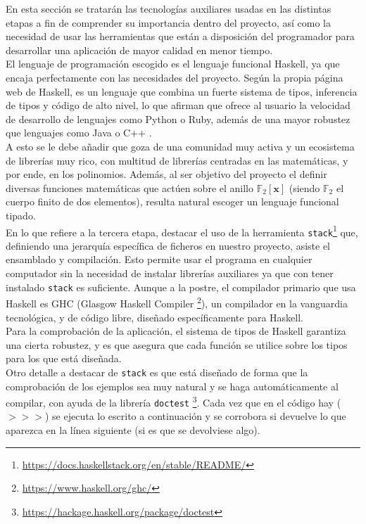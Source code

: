 En esta sección se tratarán las tecnologías auxiliares usadas en las distintas etapas a fin de comprender su importancia dentro del proyecto, así como la necesidad de usar las herramientas que están a disposición del programador para desarrollar una aplicación de mayor calidad en menor tiempo.\\

El lenguaje de programación escogido es el lenguaje funcional Haskell, ya que encaja perfectamente con las necesidades del proyecto. Según la propia página web de Haskell, es un lenguaje que combina un fuerte sistema de tipos, inferencia de tipos y código de alto nivel, lo que afirman que ofrece al usuario la velocidad de desarrollo de lenguajes como Python o Ruby, además de una mayor robustez que lenguajes como Java o C++ .\\

A esto se le debe añadir que goza de una comunidad muy activa y un ecosistema de librerías muy rico, con multitud de librerías centradas en las matemáticas, y por ende, en los polinomios. Además, al ser objetivo del proyecto el definir diversas funciones matemáticas que actúen sobre el anillo $\mathbb{F}_2 [\textbf{x}]$ (siendo $\mathbb{F}_2$ el cuerpo finito de dos elementos), resulta natural escoger un lenguaje funcional tipado.\\

En lo que refiere a la tercera etapa, destacar el uso de la herramienta \texttt{stack}\footnote{\url{https://docs.haskellstack.org/en/stable/README/}} que, definiendo una jerarquía específica de ficheros en nuestro proyecto, asiste el ensamblado y compilación. Esto permite usar el programa en cualquier computador sin la necesidad de instalar librerías auxiliares ya que con tener instalado \texttt{stack} es suficiente. Aunque a la postre, el compilador primario que usa Haskell es GHC (Glasgow Haskell Compiler \footnote{\url{https://www.haskell.org/ghc/}}), un compilador en la vanguardia tecnológica, y de código libre, diseñado específicamente para Haskell.\\

Para la comprobación de la aplicación, el sistema de tipos de Haskell garantiza una cierta robustez, y es que asegura que cada función se utilice sobre los tipos para los que está diseñada.\\

Otro detalle a destacar de \texttt{stack} es que está diseñado de forma que la comprobación de los ejemplos sea muy natural y se haga automáticamente al compilar, con ayuda de la librería \texttt{doctest} \footnote{\url{https://hackage.haskell.org/package/doctest}}. Cada vez que en el código hay ($>>>$) se ejecuta lo escrito a continuación y se corrobora si devuelve lo que aparezca en la línea siguiente (si es que se devolviese algo). 

